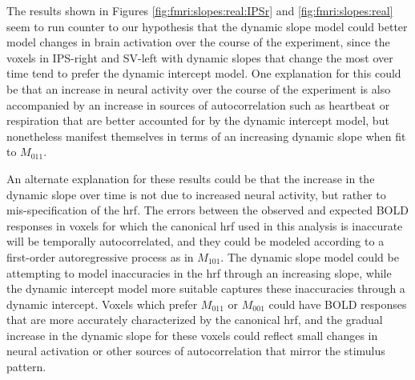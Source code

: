 The results shown in Figures \ref{fig:fmri:slopes:real:IPSr} and \ref{fig:fmri:slopes:real} seem to run counter to our hypothesis that the dynamic slope model could better model changes in brain activation over the course of the experiment, since the voxels in IPS-right and SV-left with dynamic slopes that change the most over time tend to prefer the dynamic intercept model. One explanation for this could be that an increase in neural activity over the course of the experiment is also accompanied by an increase in sources of autocorrelation such as heartbeat or respiration that are better accounted for by the dynamic intercept model, but nonetheless manifest themselves in terms of an increasing dynamic slope when fit to $M_{011}$.

An alternate explanation for these results could be that the increase in the dynamic slope over time is not due to increased neural activity, but rather to mis-specification of the hrf. The errors between the observed and expected BOLD responses in voxels for which the canonical hrf used in this analysis is inaccurate will be temporally autocorrelated, and they could be modeled according to a first-order autoregressive process as in $M_{101}$. The dynamic slope model could be attempting to model inaccuracies in the hrf through an increasing slope, while the dynamic intercept model more suitable captures these inaccuracies through a dynamic intercept. Voxels which prefer $M_{011}$ or $M_{001}$ could have BOLD responses that are more accurately characterized by the canonical hrf, and the gradual increase in the dynamic slope for these voxels could reflect small changes in neural activation or other sources of autocorrelation that mirror the stimulus pattern.


